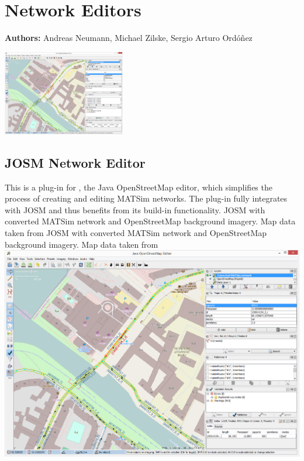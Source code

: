 \chapter{Network Editors}
\label{ch:networkeditor}

\hfill \textbf{Authors:} Andreas Neumann, Michael Zilske, Sergio Arturo Ordóñez

\begin{center} \includegraphics[width=0.4\textwidth, angle=0]{extending/figures/networkeditor/josm_screenshot} \end{center}


\section{JOSM Network Editor}
This is a plug-in for \citet[][]{JOSM2014}, the Java OpenStreetMap editor, which simplifies the process of creating and editing MATSim networks. The plug-in fully integrates with JOSM and thus benefits from its build-in functionality.
%
\createfigure
{JOSM with converted MATSim network and OpenStreetMap background imagery. Map data taken from \citet[][]{OpenStreetMap2014}}
{JOSM with converted MATSim network and OpenStreetMap background imagery. Map data taken from \citet[][]{OpenStreetMap2014}}
{\label{fig:networkeditor_screenshot}}
{\includegraphics[width=1.0\textwidth]{extending/figures/networkeditor/josm_screenshot}}
{}

